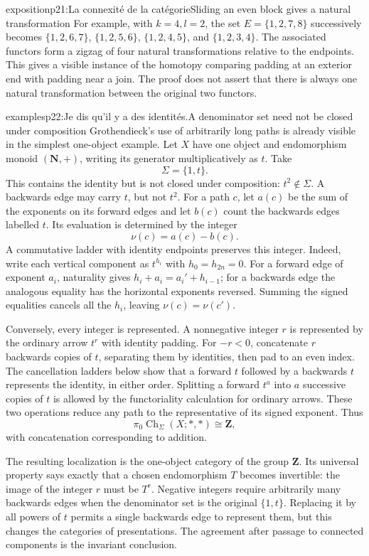 \begin{dcomment}{exposition}{p21:La connexité de la catégorie}{Sliding an even block gives a natural transformation}
For example, with $k=4,l=2$, the set $E=\{1,2,7,8\}$ successively becomes $\{1,2,6,7\}$, $\{1,2,5,6\}$, $\{1,2,4,5\}$, and $\{1,2,3,4\}$. The associated functors form a zigzag of four natural transformations relative to the endpoints. This gives a visible instance of the homotopy comparing padding at an exterior end with padding near a join. The proof does not assert that there is always one natural transformation between the original two functors.
\end{dcomment}

\begin{dcomment}{examples}{p22:Je dis qu'il y a des identités.}{A denominator set need not be closed under composition}
Grothendieck's use of arbitrarily long paths is already visible in the simplest one-object example. Let $X$ have one object and endomorphism monoid $(\mathbf N,+)$, writing its generator multiplicatively as $t$. Take
\[
 \Sigma=\{1,t\}.
\]
This contains the identity but is not closed under composition: $t^2\notin\Sigma$. A backwards edge may carry $t$, but not $t^2$. For a path $c$, let $a(c)$ be the sum of the exponents on its forward edges and let $b(c)$ count the backwards edges labelled $t$. Its evaluation is determined by the integer
\[
 \nu(c)=a(c)-b(c).
\]
A commutative ladder with identity endpoints preserves this integer. Indeed, write each vertical component as $t^{h_i}$ with $h_0=h_{2n}=0$. For a forward edge of exponent $a_i$, naturality gives $h_i+a_i=a_i'+h_{i-1}$; for a backwards edge the analogous equality has the horizontal exponents reversed. Summing the signed equalities cancels all the $h_i$, leaving $\nu(c)=\nu(c')$.

Conversely, every integer is represented. A nonnegative integer $r$ is represented by the ordinary arrow $t^r$ with identity padding. For $-r<0$, concatenate $r$ backwards copies of $t$, separating them by identities, then pad to an even index. The cancellation ladders below show that a forward $t$ followed by a backwards $t$ represents the identity, in either order. Splitting a forward $t^a$ into $a$ successive copies of $t$ is allowed by the functoriality calculation for ordinary arrows. These two operations reduce any path to the representative of its signed exponent. Thus
\[
 \pi_0\operatorname{Ch}_\Sigma(X;*,*)\cong\mathbf Z,
\]
with concatenation corresponding to addition.

The resulting localization is the one-object category of the group $\mathbf Z$. Its universal property says exactly that a chosen endomorphism $T$ becomes invertible: the image of the integer $r$ must be $T^r$. Negative integers require arbitrarily many backwards edges when the denominator set is the original $\{1,t\}$. Replacing it by all powers of $t$ permits a single backwards edge to represent them, but this changes the categories of presentations. The agreement after passage to connected components is the invariant conclusion.
\end{dcomment}

